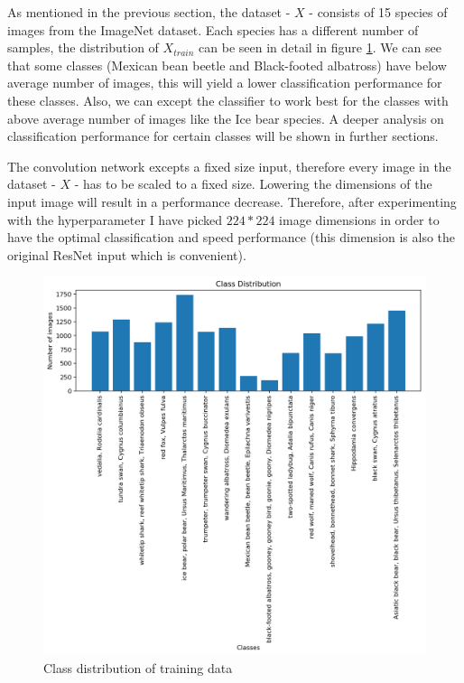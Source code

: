 \documentclass[times, utf8, diplomski]{fer}
\begin{document}
As mentioned in the previous section, the dataset - $X$ - consists of 15 species of images from the ImageNet dataset. Each species has a different number of samples, the distribution of $X_{train}$ can be seen in detail in figure \ref{fig:training_set_class_distributon}. We can see that some classes (Mexican bean beetle and Black-footed albatross) have below average number of images, this will yield a lower classification performance for these classes. Also, we can except the classifier to work best for the classes with above average number of images like the Ice bear species. A deeper analysis on classification performance for certain classes will be shown in further sections.

The convolution network excepts a fixed size input, therefore every image in the dataset - $X$ - has to be scaled to a fixed size. Lowering the dimensions of the input image will result in a performance decrease. Therefore, after experimenting with the hyperparameter I have picked $224 * 224$ image dimensions in order to have the optimal classification and speed performance (this dimension is also the original ResNet input which is convenient).

\begin{figure}
  \includegraphics[scale=0.75]{figures/class_distribution.png}
  \centering
  \caption{Class distribution of training data}
  \label{fig:training_set_class_distributon}
\end{figure}
\end{document}
